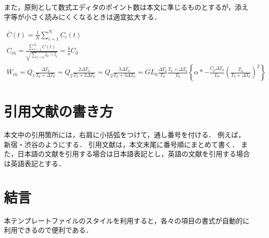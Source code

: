 \documentclass[a4paper, 10pt, dvips, fleqn, uplatex]{jsarticle}
\begin{document}
また，原則として数式エディタのポイント数は本文に準じるものとするが，添え字等が小さく読みにくくなるときは適宜拡大する．

\begin{gather}
  \bar{C}(t) = \frac{1}{N}\sum^{N}_{i=1}{C_{i}(t)} \\
  C_{th} = \frac{\displaystyle \sum^{N}_{i=1}{C(t)}}{\sqrt{\displaystyle \sum^{}_{i=0}{l_{0}-l_{i}}}}
  = \frac{b}{a}C_{0} \\
  W_{th} = Q_{1}\frac{\Delta T_{0}}{T_{0} + \Delta T_{0}}
  = Q_{2}\frac{2\Delta T_{0}}{T_{0} + 2\Delta T_{0}}
  = Q_{2}\frac{3\Delta T_{0}}{T_{0} + 3\Delta T_{0}}
  = GL_{0}\frac{\Delta T_{0}}{T_{0}}\frac{T_{0} + \Delta T_{0}}{T_{0}}
  \left\{ \alpha \ast -\frac{C_{p}\Delta T_{0}}{L_{0}}
  \left( \frac{T_{0}}{T_{0} + \Delta T_{0}} \right)^{2} \right\}
\end{gather}


\section{引用文献の書き方}

本文中の引用箇所には，右肩に小括弧をつけて，通し番号を付ける．
例えば，新宿・渋谷\supercite{shinjuku,keer}のようにする．
引用文献は，本文末尾に番号順にまとめて書く．
また，日本語の文献を引用する場合は日本語表記とし，英語の文献を引用する場合は英語表記とする．


\section{結言}

本テンプレートファイルのスタイルを利用すると，各々の項目の書式が自動的に利用できるので便利である．


\printbibliography[title=文献]
\end{document}
